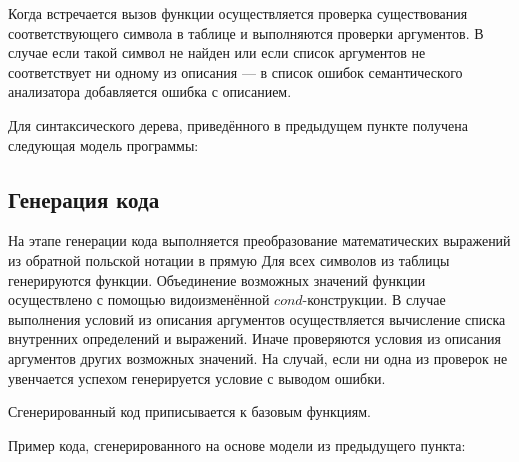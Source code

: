     Когда встречается вызов функции осуществляется проверка существования соответствующего символа в таблице и выполняются проверки аргументов.
    В случае если такой символ не найден или если список аргументов не соответствует ни одному из описания --- в список ошибок семантического анализатора добавляется ошибка с описанием.

    Для синтаксического дерева, приведённого в предыдущем пункте получена следующая модель программы:
    
    
    
    \subsection{Генерация кода}
    На этапе генерации кода выполняется преобразование математических выражений из обратной польской нотации в прямую
    Для всех символов из таблицы генерируются функции.
    Объединение возможных значений функции осуществлено с помощью видоизменённой $cond$-конструкции.
    В случае выполнения условий из описания аргументов осуществляется вычисление списка внутренних определений и выражений.
    Иначе проверяются условия из описания аргументов других возможных значений.
    На случай, если ни одна из проверок не увенчается успехом генерируется условие с выводом ошибки.

    Сгенерированный код приписывается к базовым функциям.

    Пример кода, сгенерированного на основе модели из предыдущего пункта:

    

    \subsection{}
